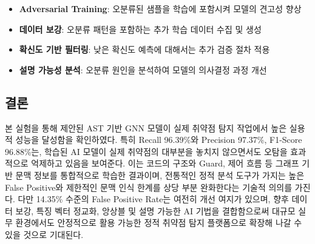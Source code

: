 \begin{itemize}
    \item \textbf{Adversarial Training}: 오분류된 샘플을 학습에 포함시켜 모델의 견고성 향상
    \item \textbf{데이터 보강}: 오분류 패턴을 포함하는 추가 학습 데이터 수집 및 생성
    \item \textbf{확신도 기반 필터링}: 낮은 확신도 예측에 대해서는 추가 검증 절차 적용
    \item \textbf{설명 가능성 분석}: 오분류 원인을 분석하여 모델의 의사결정 과정 개선
\end{itemize}

\subsection{결론}

본 실험을 통해 제안된 AST 기반 GNN 모델이 실제 취약점 탐지 작업에서 높은 실용적 성능을 달성함을 확인하였다. 특히 Recall 96.39\%와 Precision 97.37\%, F1-Score 96.88\%는, 학습된 AI 모델이 실제 취약점의 대부분을 놓치지 않으면서도 오탐을 효과적으로 억제하고 있음을 보여준다. 이는 코드의 \abbrAST 구조와 Guard, 제어 흐름 등 그래프 기반 문맥 정보를 통합적으로 학습한 결과이며, 전통적인 정적 분석 도구가 가지는 높은 False Positive와 제한적인 문맥 인식 한계를 상당 부분 완화한다는 기술적 의의를 가진다. 다만 14.35\% 수준의 False Positive Rate는 여전히 개선 여지가 있으며, 향후 데이터 보강, 특징 벡터 정교화, 앙상블 및 설명 가능한 AI 기법을 결합함으로써 대규모 실무 환경에서도 안정적으로 활용 가능한 정적 취약점 탐지 플랫폼으로 확장해 나갈 수 있을 것으로 기대된다.



